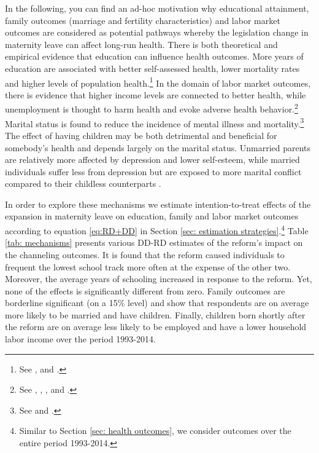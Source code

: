 \documentclass[a4paper ]{article}
\begin{document}
In the following, you can find an ad-hoc motivation why educational attainment, family outcomes (marriage and fertility characteristics) and labor market outcomes are considered as potential pathways whereby the legislation change in maternity leave can affect long-run health.\newline
There is both theoretical and empirical evidence that education can influence health outcomes. More years of education are associated with better self-assessed health, lower mortality rates and higher levels of population health.\footnote{ See \cite{arendt2005does}, \cite{lleras2005relationship} and
\cite{cutler2006education}.} In the domain of labor market outcomes, there is evidence that higher income levels are connected to better health, while unemployment is thought to harm health and evoke adverse health behavior.\footnote{See \cite{galama2015theory}, \cite{currie2009healthy}, \cite{sullivan2009job}, \cite{salm2009does} and \cite{garrouste2015lasting}.} Marital status is found to reduce the incidence of mental illness and mortality.\footnote{See \cite{gove1983does} and \cite{roelfs2011rising} .} The effect of having children may be both detrimental and beneficial for somebody's health and depends largely on the marital status. Unmarried parents are relatively more affected by depression and lower self-esteem, while married individuals suffer less from depression but are exposed to more marital conflict compared to their childless counterparts \citep{nomaguchi2003costs}.\newline

In order to explore these mechanisms we estimate intention-to-treat effects of the expansion in maternity leave on education, family and labor market outcomes according to equation \ref{eq:RD+DD} in Section \ref{sec: estimation strategies}.\footnote{Similar to Section \ref{sec: health outcomes}, we consider outcomes over the entire period 1993-2014.} Table \ref{tab: mechanisms} presents various DD-RD estimates of the reform's impact on the channeling outcomes. It is found that the reform caused individuals to frequent the lowest school track more often at the expense of the other two. Moreover, the average years of schooling increased in response to the reform. Yet, none of the effects is significantly different from zero. Family outcomes are borderline significant (on a 15\% level) and show that respondents are on average more likely to be married and have children. Finally, children born shortly after the reform are on average less likely to be employed and have a lower household labor income over the period 1993-2014.\newline
\end{document}

